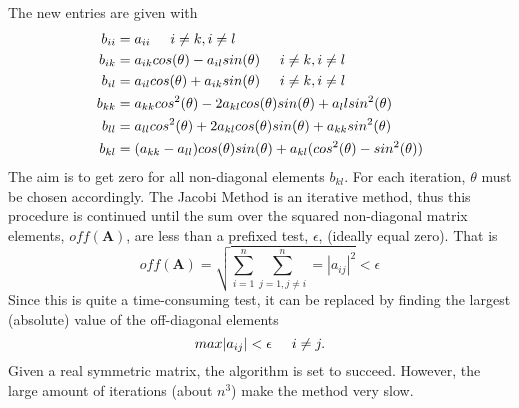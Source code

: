\documentclass[%
oneside,                 %
final,                   %
10pt]{article}
\begin{document}
The new entries are given with
\begin{equation}
\begin{aligned}
b_{ii} &= a_{ii} \hspace{0.5cm} i \neq k, i \neq l \\
b_{ik} &= a_{ik}cos(\theta) - a_{il}sin(\theta) \hspace{0.5cm} i \neq k, i \neq l \\
b_{il} &= a_{il}cos(\theta) + a_{ik}sin(\theta) \hspace{0.5cm} i \neq k, i \neq l\\
b_{kk} &= a_{kk}cos^2(\theta) -2a_{kl}cos(\theta)sin(\theta) + a_llsin^2(\theta)\\
b_{ll} &= a_{ll}cos^2(\theta) + 2a_{kl}cos(\theta)sin(\theta) + a_{kk}sin^2(\theta)\\
b_{kl} &= (a_{kk}-a_{ll})cos(\theta)sin(\theta) + a_{kl}(cos^2(\theta)-sin^2(\theta))
\end{aligned}
\end{equation}
The aim is to get zero for all non-diagonal elements $b_{kl}$. For each iteration, $\theta$ must be chosen accordingly. 
The Jacobi Method is an iterative method, thus this procedure is continued until the sum over the squared non-diagonal matrix elements, $off(\mathbf{A})$, are less than a prefixed test, $\epsilon$, (ideally equal zero). That is
\begin{equation}
off(\mathbf{A}) = \sqrt{\sum_{i=1}^{n} \sum_{j=1, j \neq i}^{n} = |a_{ij}|^2} < \epsilon
\end{equation}
Since this is quite a time-consuming test, it can be replaced by finding the largest (absolute) value of the off-diagonal elements
\begin{equation}
max|a_{ij}| < \epsilon \hspace{0.5cm} i \neq j.
\end{equation}
Given a real symmetric matrix, the algorithm is set to succeed. However, the large amount of iterations (about $n^3$) make the method very slow.


\end{document}
